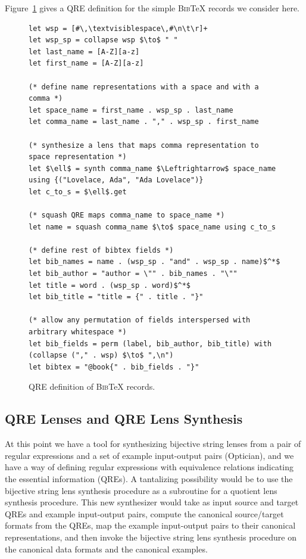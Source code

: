 \documentclass[acmsmall,screen]{acmart}
\newcommand{\bibtex}{\textsc{Bib}\TeX{}}
\begin{document}
Figure~\ref{fig:example-qre} gives a QRE definition for the simple
\bibtex{} records we consider here.
\begin{figure}
\begin{lstlisting}
let wsp = [#\,\textvisiblespace\,#\n\t\r]+
let wsp_sp = collapse wsp $\to$ " "
let last_name = [A-Z][a-z]
let first_name = [A-Z][a-z]

(* define name representations with a space and with a comma *)
let space_name = first_name . wsp_sp . last_name
let comma_name = last_name . "," . wsp_sp . first_name

(* synthesize a lens that maps comma representation to space representation *)
let $\ell$ = synth comma_name $\Leftrightarrow$ space_name using {("Lovelace, Ada", "Ada Lovelace")}
let c_to_s = $\ell$.get

(* squash QRE maps comma_name to space_name *)
let name = squash comma_name $\to$ space_name using c_to_s

(* define rest of bibtex fields *)
let bib_names = name . (wsp_sp . "and" . wsp_sp . name)$^*$
let bib_author = "author = \"" . bib_names . "\""
let title = word . (wsp_sp . word)$^*$
let bib_title = "title = {" . title . "}"

(* allow any permutation of fields interspersed with arbitrary whitespace *)
let bib_fields = perm (label, bib_author, bib_title) with (collapse ("," . wsp) $\to$ ",\n")
let bibtex = "@book{" . bib_fields . "}"
\end{lstlisting}
\caption{QRE definition of \bibtex{} records.}
\label{fig:example-qre}
\end{figure}


\subsection{QRE Lenses and QRE Lens Synthesis}
\label{sec:examplesynth}
At this point we have a tool for synthesizing bijective string lenses from a
pair of regular expressions and a set of example input-output pairs
(Optician), 
and we have a way of defining regular expressions with equivalence
relations indicating the essential information (QREs).
A tantalizing possibility would be to use the bijective string lens
synthesis procedure as a subroutine for a quotient lens synthesis procedure. 
This new synthesizer would take as input source and target QREs and 
example input-output pairs, 
compute the canonical source/target formats from the QREs, 
map the example input-output pairs to their canonical representations,
and then invoke the bijective string lens synthesis procedure on the canonical data
formats and the canonical examples.
\end{document}
